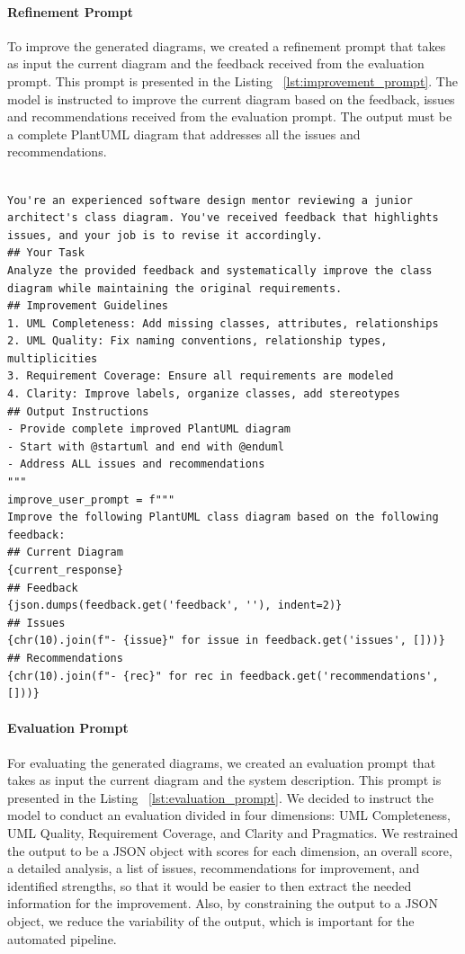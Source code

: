\paragraph{Refinement Prompt}
To improve the generated diagrams, we created a refinement prompt that takes as input the current diagram and the feedback received from the evaluation prompt. This prompt is presented in the Listing ~\ref{lst:improvement_prompt}. The model is instructed to improve the current diagram based on the feedback, issues and recommendations received from the evaluation prompt. The output must be a complete PlantUML diagram that addresses all the issues and recommendations.

\begin{lstlisting}[caption={Improvement Prompt},label={lst:improvement_prompt}, basicstyle=\ttfamily\tiny]

You're an experienced software design mentor reviewing a junior architect's class diagram. You've received feedback that highlights issues, and your job is to revise it accordingly.
## Your Task
Analyze the provided feedback and systematically improve the class diagram while maintaining the original requirements.
## Improvement Guidelines
1. UML Completeness: Add missing classes, attributes, relationships
2. UML Quality: Fix naming conventions, relationship types, multiplicities
3. Requirement Coverage: Ensure all requirements are modeled
4. Clarity: Improve labels, organize classes, add stereotypes
## Output Instructions
- Provide complete improved PlantUML diagram
- Start with @startuml and end with @enduml
- Address ALL issues and recommendations
"""
improve_user_prompt = f"""
Improve the following PlantUML class diagram based on the following feedback:
## Current Diagram
{current_response}
## Feedback
{json.dumps(feedback.get('feedback', ''), indent=2)}
## Issues
{chr(10).join(f"- {issue}" for issue in feedback.get('issues', []))}
## Recommendations
{chr(10).join(f"- {rec}" for rec in feedback.get('recommendations', []))}
\end{lstlisting}

\paragraph{Evaluation Prompt}
For evaluating the generated diagrams, we created an evaluation prompt that takes as input the current diagram and the system description. This prompt is presented in the Listing ~\ref{lst:evaluation_prompt}. 
We decided to instruct the model to conduct an evaluation divided in four dimensions: UML Completeness, UML Quality, Requirement Coverage, and Clarity and Pragmatics. 
We restrained the output to be a JSON object with scores for each dimension, an overall score, a detailed analysis, a list of issues, recommendations for improvement, and identified strengths, so that it would be easier to then extract the needed information for the improvement. Also, by constraining the output to a JSON object, we reduce the variability of the output, which is important for the automated pipeline.

